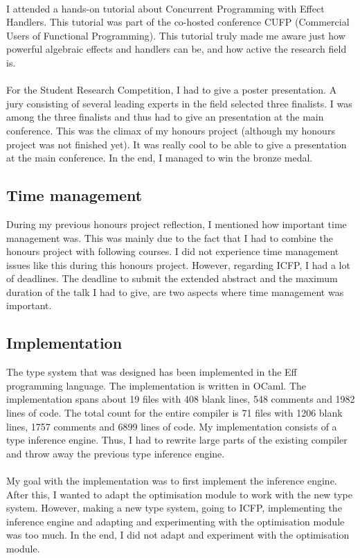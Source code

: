 \documentclass[notitlepage]{article}
\begin{document}
\\
I attended a hands-on tutorial about Concurrent Programming with Effect Handlers. This tutorial was part of the co-hosted conference CUFP (Commercial Users of Functional Programming). This tutorial truly made me aware just how powerful algebraic effects and handlers can be, and how active the research field is.\\
\\
For the Student Research Competition, I had to give a poster presentation. A jury consisting of several leading experts in the field selected three finalists. I was among the three finalists and thus had to give an presentation at the main conference. This was the climax of my honours project (although my honours project was not finished yet). It was really cool to be able to give a presentation at the main conference. In the end, I managed to win the bronze medal.

\subsection{Time management}
During my previous honours project reflection, I mentioned how important time management was. This was mainly due to the fact that I had to combine the honours project with following courses. I did not experience time management issues like this during this honours project. However, regarding ICFP, I had a lot of deadlines. The deadline to submit the extended abstract and the maximum duration of the talk I had to give, are two aspects where time management was important.

\subsection{Implementation}
The type system that was designed has been implemented in the Eff programming language. The implementation is written in OCaml. The implementation spans about 19 files with 408 blank lines, 548 comments and 1982 lines of code. The total count for the entire compiler is 71 files with 1206 blank lines, 1757 comments and 6899 lines of code. My implementation consists of a type inference engine. Thus, I had to rewrite large parts of the existing compiler and throw away the previous type inference engine.\\
\\
My goal with the implementation was to first implement the inference engine. After this, I wanted to adapt the optimisation module to work with the new type system. However, making a new type system, going to ICFP, implementing the inference engine and adapting and experimenting with the optimisation module was too much. In the end, I did not adapt and experiment with the optimisation module.
\end{document}
